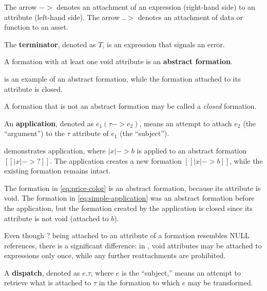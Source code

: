 The arrow $ -> $ denotes an attachment of an expression (right-hand side)
  to an attribute (left-hand side).
The arrow $ ..> $ denotes an attachment of data or function to an asset.

\begin{definition}[Terminator]
The \textbf{terminator}, denoted as $T$,
  is an expression that signals an error.
\end{definition}

\begin{definition}
A formation with at least one void attribute is an \textbf{abstract formation}.
\end{definition}

 is an example of an abstract formation,
  while the formation attached to its  attribute is closed.

A formation that is not an abstract formation may be called a \emph{closed} formation.

\begin{definition}[Application]
An \textbf{application},
  denoted as $ e_1 ( \tau -> e_2 ) $,
  means an attempt to attach \(e_2\) (the \enquote{argument}) to
  the \(\tau\) attribute of \(e_1\) (the \enquote{subject}).
\end{definition}

 demonstrates application,
  where $ |x| -> b $ is applied to an abstract formation $[[ |x| -> ? ]]$.
The application creates a new formation $[[ |x| -> b ]]$,
  while the existing formation remains intact.

The formation in \cref{eq:price-color} is an abstract formation,
  because its attribute  is void.
The formation in \cref{eq:simple-application}
  was an abstract formation before the application,
  but the formation created by the application is closed
  since its attribute  is not void (attached to \(b\)).

Even though $?$ being attached to an attribute of a formation
  resembles NULL references, there is a significant difference:
  in \phic{}, void attributes may be attached to expressions only once,
  while any further reattachments are prohibited.

\begin{definition}[Dispatch]
A \textbf{dispatch},
  denoted as $ e . \tau $, where \(e\) is the \enquote{subject,}
  means an attempt to retrieve what is attached to \(\tau\)
  in the formation to which \(e\) may be transformed.
\end{definition}

